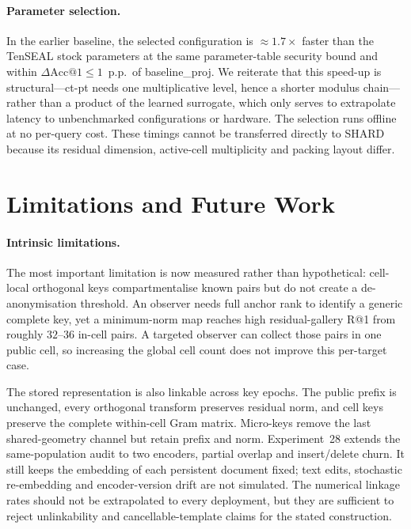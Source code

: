 \paragraph{Parameter selection.} In the earlier baseline, the selected configuration is
$\approx 1.7\times$ faster than the TenSEAL stock parameters at the same
parameter-table security bound and within $\Delta\mathrm{Acc@1}\leq 1$~p.p.\
of baseline\_proj. We reiterate that this speed-up is structural---ct-pt
needs one multiplicative level, hence a shorter modulus chain---rather than
a product of the learned surrogate, which only serves to extrapolate
latency to unbenchmarked configurations or hardware. The selection runs
offline at no per-query cost. These timings cannot be transferred directly
to SHARD because its residual dimension, active-cell multiplicity and packing
layout differ.

\section{Limitations and Future Work}\label{sec:limits}

\paragraph{Intrinsic limitations.}
The most important limitation is now measured rather than hypothetical:
cell-local orthogonal keys compartmentalise known pairs but do not create a
de-anonymisation threshold. An observer needs full anchor rank to identify a
generic complete key, yet a minimum-norm map reaches high residual-gallery
R@1 from roughly $32$--$36$ in-cell pairs. A targeted observer can collect
those pairs in one public cell, so increasing the global cell count does not
improve this per-target case.

The stored representation is also linkable across key epochs. The public
prefix is unchanged, every orthogonal transform preserves residual norm, and
cell keys preserve the complete within-cell Gram matrix. Micro-keys remove the
last shared-geometry channel but retain prefix and norm. Experiment~28 extends
the same-population audit to two encoders, partial overlap and insert/delete
churn. It still keeps the embedding of each persistent document fixed; text
edits, stochastic re-embedding and encoder-version drift are not simulated.
The numerical linkage rates should not be extrapolated to every deployment,
but they are sufficient to reject unlinkability and cancellable-template
claims for the stated construction.

